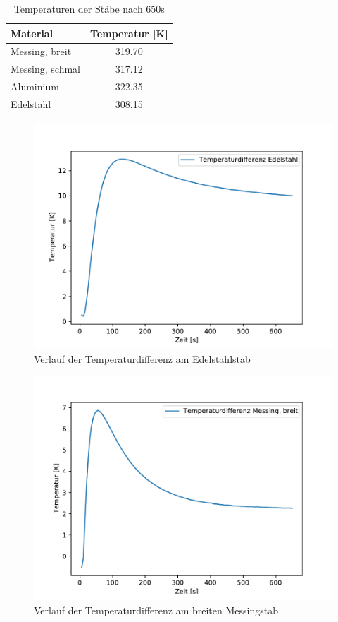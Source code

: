 \begin{table}[H]
  \centering
  \caption{Temperaturen der Stäbe nach 650s}
  \label{tab:650s}
  \begin{tabular}{l S[table-format=3.2]}
    \toprule
    {Material} & {Temperatur [K]}\\
    \midrule
    {Messing, breit} & 319.70\\
    {Messing, schmal} & 317.12\\
    {Aluminium} & 322.35\\
    {Edelstahl} & 308.15\\
    \bottomrule
  \end{tabular}
\end{table}

\begin{figure}[!htbp]
  \centering
  \includegraphics{content/differenz_edel.pdf}
  \caption{Verlauf der Temperaturdifferenz am Edelstahlstab}
  \label{fig:diff_edel}
\end{figure}

\begin{figure}[!htbp]
  \centering
  \includegraphics{content/differenz_mess.pdf}
  \caption{Verlauf der Temperaturdifferenz am breiten Messingstab}
  \label{fig:diff_mess}
\end{figure}

